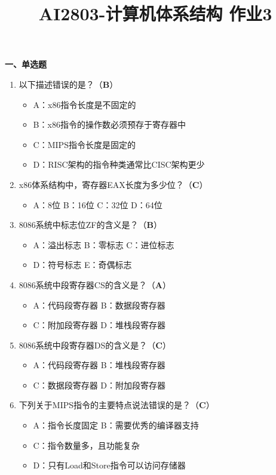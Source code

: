 \documentclass[12pt,a4paper]{article}
\title{AI2803-计算机体系结构 作业3}
\author{}
\date{}
\begin{document}
\maketitle

\textbf{一、单选题}

\begin{enumerate}
    \item 以下描述错误的是？（\textbf{B}）
    \begin{itemize}[label={}, leftmargin=*]
        \item A：x86指令长度是不固定的
        \item B：x86指令的操作数必须预存于寄存器中
        \item C：MIPS指令长度是固定的
        \item D：RISC架构的指令种类通常比CISC架构更少
    \end{itemize}

    \item x86体系结构中，寄存器EAX长度为多少位？（\textbf{C}）
    \begin{itemize}[label={}, leftmargin=*]
        \item A：8位 \quad B：16位 \quad C：32位 \quad D：64位
    \end{itemize}

    \item 8086系统中标志位ZF的含义是？（\textbf{B}）
    \begin{itemize}[label={}, leftmargin=*]
        \item A：溢出标志 \quad B：零标志 \quad C：进位标志 \quad 
        \item D：符号标志 \quad E：奇偶标志
    \end{itemize}

    \item 8086系统中段寄存器CS的含义是？（\textbf{A}）
    \begin{itemize}[label={}, leftmargin=*]
        \item A：代码段寄存器 \quad B：数据段寄存器 \quad 
        \item C：附加段寄存器 \quad D：堆栈段寄存器
    \end{itemize}

    \item 8086系统中段寄存器DS的含义是？（\textbf{C}）
    \begin{itemize}[label={}, leftmargin=*]
        \item A：代码段寄存器 \quad B：堆栈段寄存器 \quad 
        \item C：数据段寄存器 \quad D：附加段寄存器
    \end{itemize}

    \item 下列关于MIPS指令的主要特点说法错误的是？（\textbf{C}）
    \begin{itemize}[label={}, leftmargin=*]
        \item A：指令长度固定 \quad B：需要优秀的编译器支持
        \item C：指令数量多，且功能复杂 \quad 
        \item D：只有Load和Store指令可以访问存储器
    \end{itemize}
\end{enumerate}
\end{document}
